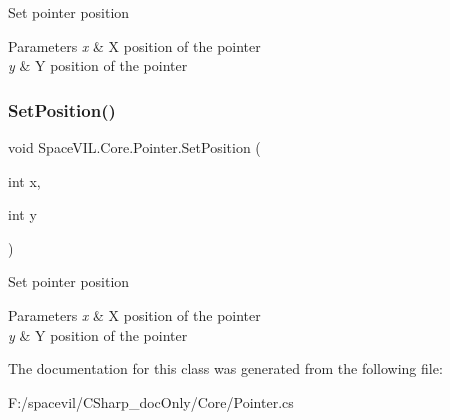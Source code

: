 Set pointer position 


\begin{DoxyParams}{Parameters}
{\em x} & X position of the pointer \\
\hline
{\em y} & Y position of the pointer \\
\hline
\end{DoxyParams}
\mbox{\label{class_space_v_i_l_1_1_core_1_1_pointer_a22add8b2868fcbf998e5b65b264e4761}} 
\subsubsection{\texorpdfstring{Set\+Position()}{SetPosition()}\hspace{0.1cm}{\footnotesize\ttfamily [2/2]}}
{\footnotesize\ttfamily void Space\+V\+I\+L.\+Core.\+Pointer.\+Set\+Position (\begin{DoxyParamCaption}\item[{int}]{x,  }\item[{int}]{y }\end{DoxyParamCaption})}



Set pointer position 


\begin{DoxyParams}{Parameters}
{\em x} & X position of the pointer \\
\hline
{\em y} & Y position of the pointer \\
\hline
\end{DoxyParams}


The documentation for this class was generated from the following file\+:\begin{DoxyCompactItemize}
\item 
F\+:/spacevil/\+C\+Sharp\+\_\+doc\+Only/\+Core/Pointer.\+cs\end{DoxyCompactItemize}
